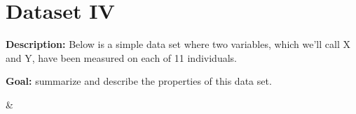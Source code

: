 \documentclass[12pt]{article}
\begin{document}
\section*{Dataset IV}

\textbf{Description:} Below is a simple  data set where two variables, which we'll call X and Y, have been measured on each of 11 individuals.

\textbf{Goal:} summarize and describe the properties of this data set.

\begin{center}
%
{\csvcoli & \csvcolii}
\end{center}
\end{document}
